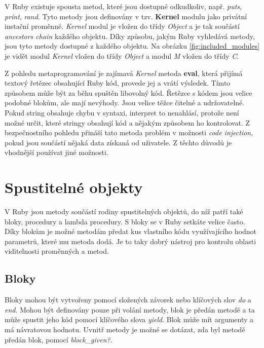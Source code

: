 \documentclass[12pt,a4paper,oneside]{article}
\begin{document}
V Ruby existuje spousta metod, které jsou dostupné odkudkoliv, např. \emph{puts}, \emph{print}, \emph{rand}. Tyto metody jsou definovány v tzv. \textbf{Kernel} modulu jako privátní instační proměnné. \emph{Kernel} modul je vložen do třídy \emph{Object} a je tak součástí \emph{ancestors chain} každého objektu. Díky způsobu, jakým Ruby vyhledává metody, jsou tyto metody dostupné z každého objektu. Na obrázku \ref{fig:included_modules} je vidět modul \emph{Kernel} vložen do třídy \emph{Object} a modul \emph{M} vložen do třídy \emph{C}.

Z pohledu metaprogramování je zajímavá \emph{Kernel} metoda \textbf{eval}, která přijímá textový řetězec obsahující Ruby kód, provede jej a vrátí výsledek. Tímto způsobem může být za běhu spuštěn libovolný kód. Řetězce s kódem jsou velice podobné blokům, ale mají nevýhody. Jsou velice těžce čitelné a udržovatelné. Pokud string obsahuje chybu v syntaxi, interpret to nenahlásí, protože není možné určit, které stringy obsahují kód a nějakým způsobem ho kontrolovat. Z bezpečnostního pohledu přináší tato metoda problém v možnosti \emph{code injection}, pokud jsou součástí nějaká data získaná od uživatele. Z těchto důvodů je vhodnější používat jiné možnosti.


\section{Spustitelné objekty}

V Ruby jsou metody součástí rodiny spustitelných objektů, do níž patří také bloky, procedury a lambda procedury. S bloky se v Ruby setkáte velice často. Díky blokům je možné metodám předat kus vlastního kódu využívajícího hodnot parametrů, které mu metoda dodá. Je to taky dobrý nástroj pro kontrolu oblasti viditelnosti proměnných a metod.

\subsection{Bloky}

Bloky mohou být vytvořeny pomocí složených závorek nebo klíčových slov \emph{do} a \emph{end}. Mohou být definovány pouze při volání metody, blok je předán metodě a ta může spustit jeho kód pomocí klíčového slova \emph{yield}. Blok může mít argumenty a má návratovou hodnotu. Uvnitř metody je možné se dotázat, zda byl metodě předán blok, pomocí \emph{block\_given?}.
\end{document}

